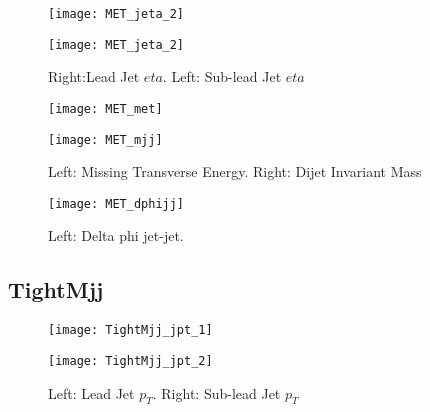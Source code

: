 \documentclass[a4paper,10pt]{article}
\begin{document}
\begin{figure}[!h]
\centering
\begin{minipage}[!h]{0.4\linewidth}
\centering
\texttt{[image: MET\_jeta\_2]}
\end{minipage}%
\begin{minipage}[!h]{0.4\linewidth}
\centering
\texttt{[image: MET\_jeta\_2]}
\end{minipage}
\caption{Right:Lead Jet $eta$. Left: Sub-lead Jet $eta$}
\end{figure}

\begin{figure}[!h]
\centering
\begin{minipage}[!h]{0.4\linewidth}
\centering
\texttt{[image: MET\_met]}
\end{minipage}%
\begin{minipage}[!h]{0.4\linewidth}
\centering
\texttt{[image: MET\_mjj]}
\end{minipage}
\caption{Left: Missing Transverse Energy. Right: Dijet Invariant Mass}
\end{figure}

\begin{figure}[!h]
\centering
\begin{minipage}[!h]{0.4\linewidth}
\centering
\texttt{[image: MET\_dphijj]}
\end{minipage}%
\begin{minipage}[!h]{0.4\linewidth}
\centering
\end{minipage}
\caption{Left: Delta phi jet-jet.}
\end{figure}

\clearpage
\subsection{TightMjj}

\begin{figure}[!h]
\centering
\begin{minipage}[!h]{0.4\linewidth}
\centering
\texttt{[image: TightMjj\_jpt\_1]}
\end{minipage}%
\begin{minipage}[!h]{0.4\linewidth}
  \texttt{[image: TightMjj\_jpt\_2]}
\end{minipage}
\caption{Left: Lead Jet $p_T$. Right: Sub-lead Jet $p_T$}
\end{figure}
\end{document}
